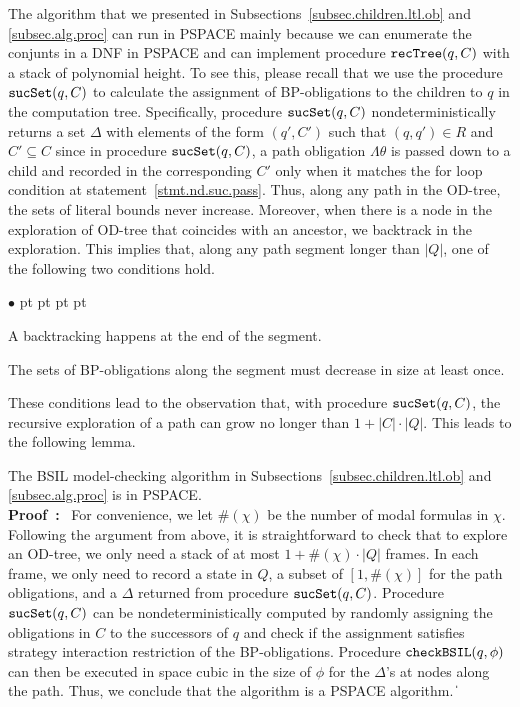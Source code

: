\documentclass[11pt]{article}
\newcommand{\ttsynsuc}{\mbox{\tt sucSet}}
\newcommand{\ttchksil}{\mbox{\tt checkBSIL}}
\newcommand{\ttrecsyn}{\mbox{\tt recTree}}
\newcommand{\pf}{\noindent\mbox{\bf Proof : }}
\def\qed{\ifmmode\|\else{\unskip\nobreak\hfil
\penalty50\hskip1em\null\nobreak\hfil$\blacksquare$
\parfillskip=0pt\finalhyphendemerits=0\endgraf}\fi}
\newenvironment{list1}{\begin{list}{$\bullet$}
{\topsep 0 pt \parsep 0 pt \partopsep 0 pt \itemsep 0 pt}}{\end{list}}
\begin{document}
The algorithm that we presented in
Subsections~\ref{subsec.children.ltl.ob} and \ref{subsec.alg.proc}
can run in PSPACE mainly because we can 
enumerate the conjunts in a DNF in PSPACE and can implement procedure
$\ttrecsyn(q,C)$ with a stack of polynomial height. 
To see this, please recall that we use the procedure
$\ttsynsuc(q,C)$ to calculate the assignment of
BP-obligations to the children to $q$ in the computation tree. 
Specifically, procedure
$\ttsynsuc(q,C)$ nondeterministically returns a
set $\Delta$ with elements of the form $(q',C')$ such that
$(q,q')\in R$ and $C'\subseteq C$ since \label{reply2.CpsubseteqC} 
in procedure $\ttsynsuc(q,C)$, 
a path obligation $\Lambda\theta$ is passed down to a child and 
recorded in the corresponding $C'$ only when it 
matches the for loop condition at statement~\ref{stmt.nd.suc.pass}.  
Thus, along any path in the OD-tree, 
the sets of literal bounds never increase.  
Moreover, 
when there is a node in the exploration of OD-tree that coincides
with an ancestor, we backtrack in the exploration. This implies
that,
along any path segment longer than $|Q|$, one of the
following two conditions hold.
\begin{list1}
\item A backtracking happens at the end of the segment. 
\item The sets of BP-obligations along the segment must decrease in size at
	least once.
\end{list1}
These conditions lead to the observation that, with procedure
$\ttsynsuc(q,C)$, the recursive exploration of
a path can grow no longer than $1+|C|\cdot|Q|$. This
leads to the following lemma.

{\lemma \label{lemma.alg.pspace} The BSIL model-checking algorithm
in Subsections~\ref{subsec.children.ltl.ob} and
\ref{subsec.alg.proc} is in PSPACE.}
\\\pf 
For convenience, we let 
$\#(\chi)$ be the number of modal formulas in $\chi$.  
Following the argument from above,
it is straightforward to check that to explore an OD-tree, we only
need a stack of at most $1+\#(\chi)\cdot|Q|$ frames. 
In each frame, we only need to record a state in $Q$, a subset of
$[1,\#(\chi)]$ for the path obligations, and a $\Delta$
returned from procedure $\ttsynsuc(q,C)$.
Procedure $\ttsynsuc(q,C)$ can be
nondeterministically computed by randomly assigning the
obligations in $C$ to the successors of $q$ and check if the
assignment satisfies strategy interaction restriction of 
the BP-obligations.
Procedure $\ttchksil(q,\phi)$ can then be executed in space
cubic in the size of $\phi$ for the $\Delta$'s at nodes along the path. 
Thus, we conclude that the algorithm
is a PSPACE algorithm.  
\qed 
\end{document}
